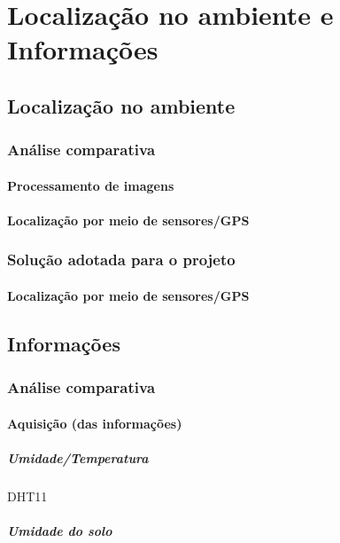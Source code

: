 \section{Localização no ambiente e Informações}

\subsection{Localização no ambiente}

\subsubsection{Análise comparativa}

\paragraph{Processamento de imagens}

\paragraph{Localização por meio de sensores/GPS}

\subsubsection{Solução adotada para o projeto}

\paragraph{Localização por meio de sensores/GPS}

\subsection{Informações}

\subsubsection{Análise comparativa}

\paragraph{Aquisição (das informações)}

\subparagraph{Umidade/Temperatura}

DHT11

\subparagraph{Umidade do solo}

